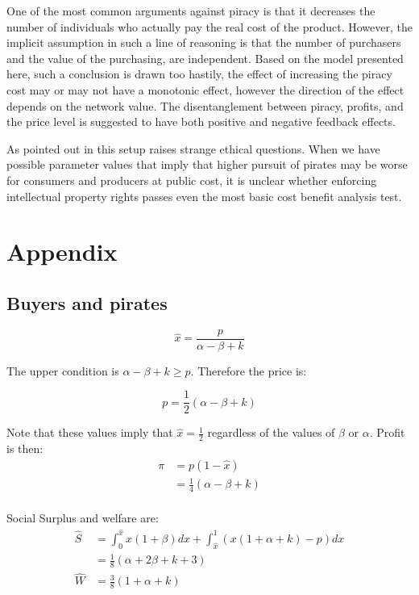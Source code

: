 One of the most common arguments against piracy is that it decreases the number of individuals who actually pay the real cost of the product.  However, the implicit assumption in such a line of reasoning is that the number of purchasers and the value of the purchasing, are independent. Based on the model presented here, such a conclusion is drawn too hastily, the effect of increasing the piracy cost may or may not have a monotonic effect, however the direction of the effect depends on the network value. The disentanglement between piracy, profits, and the price level is suggested to have both positive and negative feedback effects.

As pointed out in \cite{CRP91} this setup raises strange ethical questions. When we have possible parameter values that imply that higher pursuit of pirates may be worse for consumers and producers at public cost, it is unclear whether enforcing intellectual property rights passes even the most basic cost benefit analysis test.

\newpage

\section{Appendix}

\subsection{Buyers and pirates}
\begin{equation*}
\hat{x} = \frac{p}{\alpha-\beta + k}
\end{equation*}

The upper condition is $\alpha-\beta+k \geq p$. Therefore the price is:

\begin{equation*}
p = \frac{1}{2}\left(
\alpha-\beta+k
\right)
\end{equation*}

Note that these values imply that $\hat{x} = \frac{1}{2}$ regardless of the values of $\beta$ or $\alpha$. Profit is then:
\begin{align*}
\pi &= p(1-\hat{x}) \\
&=  \frac{1}{4}\left(
\alpha-\beta+k
\right)  \\
\end{align*}

Social Surplus and welfare are:
\begin{align*}
\hat{S} &= \int_0^{\hat{x}}x(1+\beta)dx+
\int_{\hat{x}}^{1}\left( x(1+\alpha+k)-p \right)dx \\
&= \frac{1}{8} (\alpha+2 \beta+k+3) \\
\hat{W} &= \frac{3}{8} \left( 1 + \alpha +k
\right)
\end{align*}



